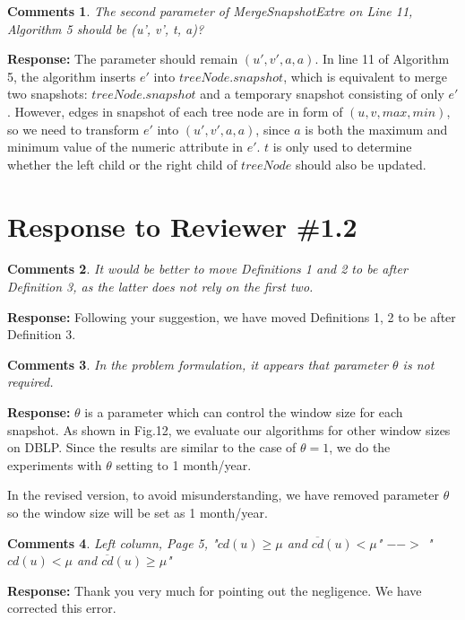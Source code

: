 \documentclass{article}
\newtheorem{Comments}{\textbf{Comments}}
\begin{document}
\begin{Comments}
The second parameter of MergeSnapshotExtre on Line 11, Algorithm 5 should be (u’, v’, t, a)?
\end{Comments}
\noindent \textbf{Response:} The parameter should remain $ (u',v',a,a) $. In line 11 of Algorithm 5, the algorithm inserts $ e' $ into $ treeNode.snapshot $, which is equivalent to merge two snapshots: $ treeNode.snapshot $ and a temporary snapshot consisting of only $ e' $. However, edges in snapshot of each tree node are in form of $ (u,v,max,min) $, so we need to transform $ e' $ into $ (u',v',a,a) $, since $ a $ is both the maximum and minimum value of the numeric attribute in $ e' $. $ t $ is only used to determine whether the left child or the right child of $ treeNode $ should also be updated.



\section{Response to Reviewer \#1.2}
\setcounter{Comments}{0}
\begin{Comments}
It would be better to move Definitions 1 and 2 to be after Definition 3, as the latter does not rely on the first two.
\end{Comments}
\noindent \textbf{Response: } Following your suggestion, we have moved Definitions 1, 2 to be after Definition 3.


\begin{Comments}
In the problem formulation, it appears that parameter $\theta$ is not required.
\end{Comments}
\noindent \textbf{Response: } $\theta$ is a parameter which can control the window size for each snapshot. As shown in Fig.12, we evaluate our algorithms for other window sizes on DBLP. Since the results are similar to the case of $\theta=1$, we do the experiments with $\theta$ setting to 1 month/year.

In the revised version, to avoid misunderstanding, we have removed parameter $\theta$ so the window size will be set as 1 month/year.

\begin{Comments}
 Left column, Page 5, "$cd(u) \geq \mu$ and $\overline{cd}(u) < \mu$" $-->$ "$cd(u) < \mu$ and $\overline{cd}(u) \geq \mu$"
\end{Comments}
\noindent \textbf{Response: } Thank you very much for pointing out the negligence. We have corrected this error.
\end{document}
